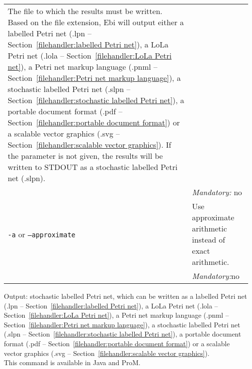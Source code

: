 {\begin{tabularx}{\linewidth}{lX}
The file to which the results must be written. Based on the file extension, Ebi will output either a labelled Petri net (.lpn -- Section~\ref{filehandler:labelled Petri net}), a LoLa Petri net (.lola -- Section~\ref{filehandler:LoLa Petri net}), a Petri net markup language (.pnml -- Section~\ref{filehandler:Petri net markup language}), a stochastic labelled Petri net (.slpn -- Section~\ref{filehandler:stochastic labelled Petri net}), a portable document format (.pdf -- Section~\ref{filehandler:portable document format}) or a scalable vector graphics (.svg -- Section~\ref{filehandler:scalable vector graphics}).
If the parameter is not given, the results will be written to STDOUT as a stochastic labelled Petri net (.slpn).\\
&\textit{Mandatory:} \quad no\\
\texttt{-a} or \texttt{--approximate} & Use approximate arithmetic instead of exact arithmetic.\\
&\textit{Mandatory:}\quad no\\
\bottomrule
\end{tabularx}
\noindent Output: stochastic labelled Petri net, which can be written as a labelled Petri net (.lpn -- Section~\ref{filehandler:labelled Petri net}), a LoLa Petri net (.lola -- Section~\ref{filehandler:LoLa Petri net}), a Petri net markup language (.pnml -- Section~\ref{filehandler:Petri net markup language}), a stochastic labelled Petri net (.slpn -- Section~\ref{filehandler:stochastic labelled Petri net}), a portable document format (.pdf -- Section~\ref{filehandler:portable document format}) or a scalable vector graphics (.svg -- Section~\ref{filehandler:scalable vector graphics}).
\\This command is available in Java and ProM.
}
